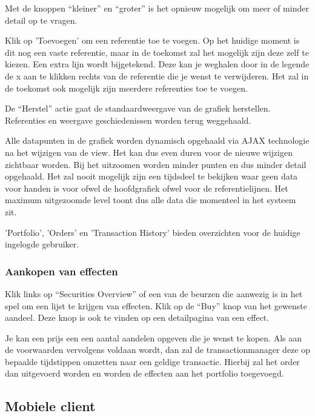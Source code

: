 Met de knoppen ``kleiner'' en ``groter'' is het opnieuw mogelijk om meer of minder detail op te vragen.

Klik op 'Toevoegen' om een referentie toe te voegen. Op het huidige moment is dit nog een vaste referentie, maar in de toekomst zal het mogelijk zijn deze zelf te kiezen. Een extra lijn wordt bijgetekend. Deze kan je weghalen door in de legende de x aan te klikken rechts van de referentie die je wenst te verwijderen.
Het zal in de toekomst ook mogelijk zijn meerdere referenties toe te voegen.

De ``Herstel'' actie gaat de standaardweergave van de grafiek herstellen. Referenties en weergave geschiedenissen worden terug weggehaald.

Alle datapunten in de grafiek worden dynamisch opgehaald via AJAX technologie na het wijzigen van de view. Het kan dus even duren voor de nieuwe wijzigen zichtbaar worden. Bij het uitzoomen worden minder punten en dus minder detail opgehaald. Het zal nooit mogelijk zijn een tijdsdeel te bekijken waar geen data voor handen is voor ofwel de hoofdgrafiek ofwel voor de referentielijnen. Het maximum uitgezoomde level toont dus alle data die momenteel in het systeem zit.

'Portfolio', 'Orders' en 'Transaction History' bieden overzichten voor de huidige ingelogde gebruiker.

\subsubsection{Aankopen van effecten}

Klik links op ``Securities Overview'' of een van de beurzen die aanwezig is in het spel om een lijst te krijgen van effecten. Klik op de ``Buy'' knop van het gewenste aandeel. Deze knop is ook te vinden op een detailpagina van een effect.

Je kan een prijs een een aantal aandelen opgeven die je wenst te kopen. Als aan de voorwaarden vervolgens voldaan wordt, dan zal de transactionmanager deze op bepaalde tijdstippen omzetten naar een geldige transactie. Hierbij zal het order dan uitgevoerd worden en worden de effecten aan het portfolio toegevoegd.

\subsection{Mobiele client}

